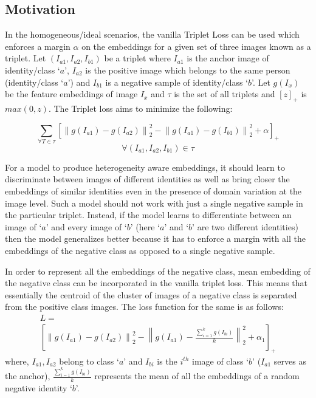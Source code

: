 \documentclass[10pt,twocolumn,letterpaper]{article}
\begin{document}
\subsection{Motivation}
In the homogeneous/ideal scenarios, the vanilla Triplet Loss \cite{schroff2015facenet} can be used which enforces a margin $\alpha$ on the embeddings for a given set of three images known as a triplet. Let $(I_{a1}, I_{a2}, I_{b1})$ be a triplet where $I_{a1}$ is the anchor image of identity/class `$a$', $I_{a2}$ is the positive image which belongs to the same person (identity/class `$a$') and $I_{b1}$ is a negative sample of identity/class `$b$'. Let $g(I_x)$ be the feature embeddings of image $I_x$ and $\tau$ is the set of all triplets and $[z]_+$ is $max(0,z)$. The Triplet loss \cite{schroff2015facenet} aims to minimize the following:

\begin{equation}
  \label{eqn:basic_triplet}
	\sum_{\forall T \in \tau} \left [\left \| g(I_{a1}) - g(I_{a2}) \right \|^2_2 - \left \| g(I_{a1}) - g(I_{b1}) \right \|^2_2   + \alpha \right]_+
\end{equation}
\begin{equation*}
  \forall (I_{a1}, I_{a2}, I_{b1}) \in \tau
\end{equation*}

For a model to produce heterogeneity aware embeddings, it should learn to discriminate between images of different identities as well as bring closer the embeddings of similar identities even in the presence of domain variation at the image level. Such a model should not work with just a single negative sample in the particular triplet. Instead, if the model learns to differentiate between an image of `$a$' and every image of `$b$' (here `$a$' and `$b$' are two different identities) then the model generalizes better because it has to enforce a margin with all the embeddings of the negative class as opposed to a single negative sample.



In order to represent all the embeddings of the negative class, mean embedding of the negative class can be incorporated in the vanilla triplet loss. This means that essentially the centroid of the cluster of images of a negative class is separated from the positive class images. The loss function for the same is as follows:
\vspace{-5pt}
\begin{multline}
  \label{eqn:new_triplet}
  L = \\
  \left [\left \| g(I_{a1}) - g(I_{a2}) \right \|^2_2 - \left \| g(I_{a1}) - \frac{\sum_{i=1}^kg(I_{bi})}{k} \right \|^2_2   + \alpha_1 \right]_+
\end{multline}
where, $I_{a1}, I_{a2}$ belong to class `$a$' and $I_{bi}$ is the $i^{th}$ image of class `$b$' ($I_{a1}$ serves as the anchor),  $\frac{\sum_{i=1}^kg(I_{bi})}{k}$ represents the mean of all the embeddings of a random negative identity `$b$'.
\end{document}

